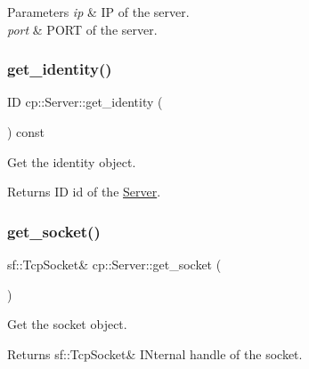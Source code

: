 \begin{DoxyParams}{Parameters}
{\em ip} & IP of the server. \\
\hline
{\em port} & P\+O\+RT of the server. \\
\hline
\end{DoxyParams}
\mbox{\label{classcp_1_1_server_a9a492566ee0efac90c49dec317876311}} 
\subsubsection{\texorpdfstring{get\+\_\+identity()}{get\_identity()}}
{\footnotesize\ttfamily ID cp\+::\+Server\+::get\+\_\+identity (\begin{DoxyParamCaption}{ }\end{DoxyParamCaption}) const\hspace{0.3cm}{\ttfamily [inline]}}



Get the identity object. 

\begin{DoxyReturn}{Returns}
ID id of the \hyperlink{classcp_1_1_server}{Server}. 
\end{DoxyReturn}
\mbox{\label{classcp_1_1_server_aa55a5008f274c0ffd2afa632ec857df7}} 
\subsubsection{\texorpdfstring{get\+\_\+socket()}{get\_socket()}}
{\footnotesize\ttfamily sf\+::\+Tcp\+Socket\& cp\+::\+Server\+::get\+\_\+socket (\begin{DoxyParamCaption}{ }\end{DoxyParamCaption})\hspace{0.3cm}{\ttfamily [inline]}}



Get the socket object. 

\begin{DoxyReturn}{Returns}
sf\+::\+Tcp\+Socket\& I\+Nternal handle of the socket. 
\end{DoxyReturn}
\mbox{\label{classcp_1_1_server_ae880b305b96776c6c6d38b29a4d3007b}} 
